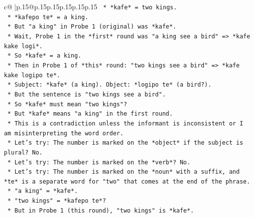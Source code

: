 \documentclass{article}
\begin{document}
{\begin{supertabular}{c@{$\;$}|p{.15\linewidth}@{}p{.15\linewidth}p{.15\linewidth}p{.15\linewidth}p{.15\linewidth}p{.15\linewidth}}
{{{\texttt{                                                *   *kafe* = two kings.} \\
\texttt{                                                *   *kafepo te* = a king.} \\
\texttt{                                            *   But "a king" in Probe 1 (original) was *kafe*.} \\
\texttt{                                            *   Wait, Probe 1 in the *first* round was "a king see a bird" => *kafe kake logi*.} \\
\texttt{                                            *   So *kafe* = a king.} \\
\texttt{                                            *   Then in Probe 1 of *this* round: "two kings see a bird" => *kafe kake logipo te*.} \\
\texttt{                                                *   Subject: *kafe* (a king). Object: *logipo te* (a bird?).} \\
\texttt{                                                *   But the sentence is "two kings see a bird".} \\
\texttt{                                                *   So *kafe* must mean "two kings"?} \\
\texttt{                                                *   But *kafe* means "a king" in the first round.} \\
\texttt{                                                *   This is a contradiction unless the informant is inconsistent or I am misinterpreting the word order.} \\
\texttt{                                                *   Let's try: The number is marked on the *object* if the subject is plural? No.} \\
\texttt{                                                *   Let's try: The number is marked on the *verb*? No.} \\
\texttt{                                                *   Let's try: The number is marked on the *noun* with a suffix, and *te* is a separate word for "two" that comes at the end of the phrase.} \\
\texttt{                                                *   "a king" = *kafe*.} \\
\texttt{                                                *   "two kings" = *kafepo te*?} \\
\texttt{                                                *   But in Probe 1 (this round), "two kings" is *kafe*.} \\
}}}
\end{supertabular}}
\end{document}
